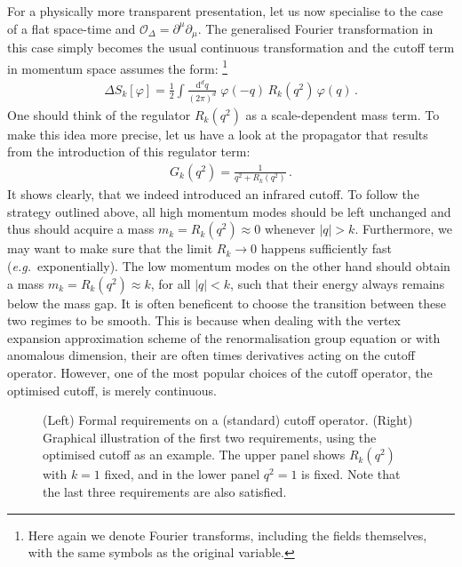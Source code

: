 \documentclass[11pt]{book}
\newcommand\eg{\textit{e.g.}\ }
\numberwithin{equation}{chapter}
\begin{document}
For a physically more transparent presentation, let us now specialise
to the case of a flat space-time
and $\mathcal O_\Delta = \partial^\mu \partial_\mu$.
The generalised Fourier transformation in this case simply becomes
the usual continuous transformation and the cutoff term in
momentum space assumes the form:%
\footnote{
  Here again we denote Fourier transforms, including the fields themselves,
  with the same symbols as the original variable.
}
\begin{align}
  \Delta S_k [\varphi] = \frac 12 \int \frac{ \mathrm d^dq }{ (2\pi)^d } \;
  \varphi(-q) \, R_k(q^2) \, \varphi(q) \,.
\end{align}
One should think of the regulator $R_k(q^2)$ as a scale-dependent
mass term. To make this idea more precise, let us have a look
at the propagator that results from the introduction of this regulator term:
\begin{align}
  G_k(q^2) = \frac{1}{ q^2 + R_k(q^2) } \,.
\end{align}
It shows clearly, that we indeed introduced an infrared cutoff.
To follow the strategy outlined above, all high momentum modes
should be left unchanged and thus should acquire a mass
$m_k = R_k(q^2) \approx 0$ whenever $|q| > k$. Furthermore,
we may want to make sure that the limit $R_k \rightarrow 0$
happens sufficiently fast (\eg exponentially). The low momentum
modes on the other hand should obtain a mass $m_k = R_k(q^2) \approx k$,
for all $|q| < k$, such that their energy always remains below the mass gap.
It is often beneficent to choose the transition between these two regimes
to be smooth. This is because when dealing with the vertex expansion
approximation scheme of the renormalisation group equation or with
anomalous dimension, their are often times derivatives acting on the cutoff
operator. However, one of the most popular choices of the cutoff operator,
the optimised cutoff, is merely continuous.

\begin{figure}
  \begin{center}
    
  \end{center}
  \caption{
    (Left) Formal requirements on a (standard) cutoff operator.
    (Right) Graphical illustration of the first two requirements, using
    the optimised cutoff as an example. The upper panel shows $R_k(q^2)$
    with $k=1$ fixed, and in the lower panel $q^2=1$ is fixed.
    Note that the last three requirements are also satisfied.
  }
  \label{fig:standardcutoff}
\end{figure}
\end{document}
